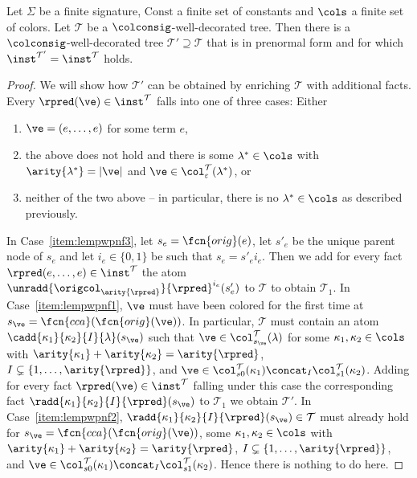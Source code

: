 \begin{lemma}\label{lem:toprenf}
	Let $\Sigma$ be a finite signature, $\mathrm{Const}$ a finite set of constants and $\cols$ a finite set of colors. Let $\mathcal{T}$ be a $\colconsig$-well-decorated tree. Then there is a  $\colconsig$-well-decorated tree $\mathcal{T}'\supseteq \mathcal{T}$ that is in prenormal form and for which $\inst^{\mathcal{T}'} = \inst^{\mathcal{T}}$ holds.
\end{lemma}
\begin{proof} We will show how $\mathcal{T}'$ can be obtained by enriching $\mathcal{T}$ with additional facts.
	Every $\rpred(\ve)\in\inst^{\mathcal{T}}$ falls into one of three cases: Either
	\begin{enumerate}
		\item\label{item:lempwpnf3} $\ve = (e, \ldots, e)$ for some term $e$,
		\item\label{item:lempwpnf1} the above does not hold and there is some $\lambda^*\in\cols$ with $\arity{\lambda^*} = |\ve|$ and $\ve\in\col_{\varepsilon}^{\mathcal{T}}(\lambda^*)$, or
		\item\label{item:lempwpnf2} neither of the two above -- in particular, there is no  $\lambda^*\in\cols$ as described previously. 
	\end{enumerate}
    In Case~\ref{item:lempwpnf3}, let $s_e = \fcn{orig}(e)$, let $s'_e$ be the unique parent node of $s_e$ and let $i_e\in\{ 0,1 \}$ be such that $s_e = s'_ei_e$. Then we add for every fact $\rpred(e, \ldots, e)\in\inst^{\mathcal{T}}$ the atom $\unradd{\origcol_{\arity{\rpred}}}{\rpred}^{i_e}(s'_e)$ to $\mathcal{T}$ to obtain $\mathcal{T}_1$.
	\newline
	In Case~\ref{item:lempwpnf1}, $\ve$ must have been colored for the first time at $s_{\ve} = \fcn{cca}(\fcn{orig}(\ve))$. In particular, $\mathcal{T}$ must contain an atom  $\cadd{\kappa_1}{\kappa_2}{I}{\lambda}(s_{\ve})$ such that $\ve\in\col_{s_{\ve}}^{\mathcal{T}}(\lambda)$ for some $\kappa_1, \kappa_2\in\cols$ with $\arity{\kappa_1}+\arity{\kappa_2} = \arity{\rpred}$, $I\subsetneq \{ 1, \ldots, \arity{\rpred}\}$, and $\ve \in \col_{s0}^{\mathcal{T}}(\kappa_1) \concat_{I} \col_{s1}^{\mathcal{T}}(\kappa_2)$.
	Adding for every fact $\rpred(\ve)\in\inst^{\mathcal{T}}$ falling under this case the corresponding fact $\radd{\kappa_1}{\kappa_2}{I}{\rpred}(s_{\ve})$ to $\mathcal{T}_1$ we obtain $\mathcal{T}'$.
	\newline
	In Case~\ref{item:lempwpnf2}, $\radd{\kappa_1}{\kappa_2}{I}{\rpred}(s_{\ve})\in\mathcal{T}$ must already hold for $s_{\ve} = \fcn{cca}(\fcn{orig}(\ve))$, some $\kappa_1, \kappa_2\in\cols$ with $\arity{\kappa_1}+\arity{\kappa_2} = \arity{\rpred}$, $I\subsetneq \{ 1, \ldots, \arity{\rpred}\}$, and $\ve \in \col_{s0}^{\mathcal{T}}(\kappa_1) \concat_{I} \col_{s1}^{\mathcal{T}}(\kappa_2)$. Hence there is nothing to do here.
	\newline
	

\end{proof}
